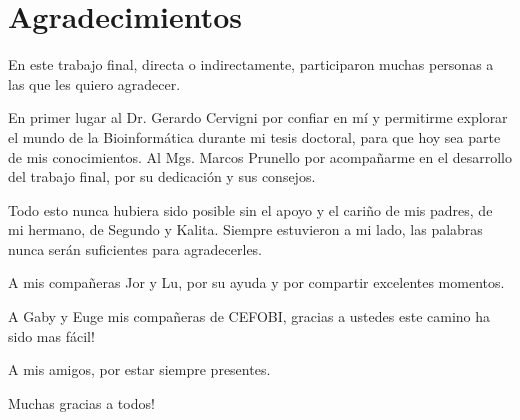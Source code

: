 
\chapter*{Agradecimientos}


En este trabajo final, directa o indirectamente, participaron muchas personas a las que les quiero agradecer.

En primer lugar al Dr. Gerardo Cervigni por confiar en mí y permitirme explorar el mundo de la Bioinformática durante mi tesis doctoral, para que hoy sea parte de mis conocimientos. Al Mgs. Marcos Prunello por acompañarme en el desarrollo del trabajo final, por su dedicación y sus consejos.

Todo esto nunca hubiera sido posible sin el apoyo y el cariño de mis padres, de mi hermano, de Segundo y Kalita. Siempre estuvieron a mi lado, las palabras nunca serán suficientes para agradecerles.

A mis compañeras Jor y Lu, por su ayuda y por compartir excelentes momentos.


A Gaby y Euge mis compañeras de CEFOBI, gracias a ustedes este camino ha sido mas fácil!

A mis amigos, por estar siempre presentes.

Muchas gracias a todos! 




